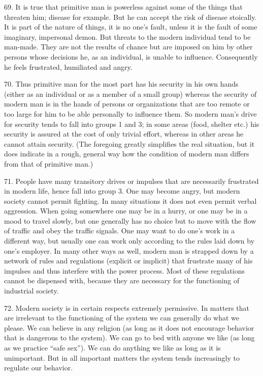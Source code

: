 \documentclass{article}
\begin{document}
69.  It is true that primitive man is powerless against some of the things that threaten him; disease 
for example.  But he can accept the risk of disease stoically.  It is part of the nature of things, it is 
no  one’s  fault,  unless  it  is  the  fault  of  some  imaginary,  impersonal  demon.   But  threats  to  the  
modern individual tend to be man-made.  They are not the results of chance but are imposed on 
him by other persons whose decisions he, as an individual, is unable to influence.  Consequently 
he feels frustrated, humiliated and angry. \vspace{\baselineskip}

70.  Thus primitive man for the most part has his security in his own hands (either as an individual 
or as a member of a small group) whereas the security of modern man is in the hands of persons 
or organizations that are too remote or too large for him to be able personally to influence them.  So 
modern man’s drive for security tends to fall into groups 1 and 3; in some areas (food, shelter etc.) 
his  security  is  assured  at  the  cost  of  only  trivial  effort,  whereas  in  other  areas  he  cannot  attain 
security.  (The foregoing greatly simplifies the real situation, but it does indicate in a rough, general 
way how the condition of modern man differs from that of primitive man.) \vspace{\baselineskip}

71.  People have many transitory drives or impulses that are necessarily frustrated in modern life, 
hence fall into group 3. One may become angry, but modern society cannot permit fighting.   In 
many situations it does not even permit verbal aggression.  When going somewhere one may be in 
a hurry, or one may be in a mood to travel slowly, but one generally has no choice but to move 
with the flow of traffic and obey the traffic signals.  One may want to do one’s work in a different 
way, but usually one can work only according to the rules laid down by one’s employer.  In many 
other ways as well, modern man is strapped down by a network of rules and regulations (explicit 
or implicit) that frustrate many of his impulses and thus interfere with the power process.  Most of 
these  regulations  cannot  be  dispensed  with,  because  they  are  necessary  for  the  functioning  of  
industrial society. \vspace{\baselineskip}

72.  Modern society is in certain respects extremely permissive.  In matters that are irrelevant to 
the functioning of the system we can generally do what we please.  We can believe in any religion 
(as long as it does not encourage behavior that is dangerous to the system).  We can go to bed with 
anyone we like (as long as we practice “safe sex”).  We can do anything we like as long as it is 
unimportant.  But in all important matters the system tends increasingly to regulate our behavior. \vspace{\baselineskip}
\end{document}
